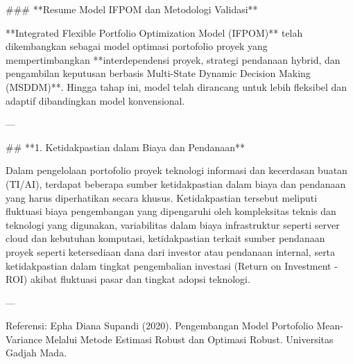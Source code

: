### **Resume Model IFPOM dan Metodologi Validasi**

**Integrated Flexible Portfolio Optimization Model (IFPOM)** telah dikembangkan sebagai model optimasi portofolio proyek yang mempertimbangkan **interdependensi proyek, strategi pendanaan hybrid, dan pengambilan keputusan berbasis Multi-State Dynamic Decision Making (MSDDM)**. Hingga tahap ini, model telah dirancang untuk lebih fleksibel dan adaptif dibandingkan model konvensional.

---

## **1. Ketidakpastian dalam Biaya dan Pendanaan**

Dalam pengelolaan portofolio proyek teknologi informasi dan kecerdasan buatan (TI/AI), terdapat beberapa sumber ketidakpastian dalam biaya dan pendanaan yang harus diperhatikan secara khusus. Ketidakpastian tersebut meliputi fluktuasi biaya pengembangan yang dipengaruhi oleh kompleksitas teknis dan teknologi yang digunakan, variabilitas dalam biaya infrastruktur seperti server cloud dan kebutuhan komputasi, ketidakpastian terkait sumber pendanaan proyek seperti ketersediaan dana dari investor atau pendanaan internal, serta ketidakpastian dalam tingkat pengembalian investasi (Return on Investment - ROI) akibat fluktuasi pasar dan tingkat adopsi teknologi.

---

Referensi: Epha Diana Supandi (2020). Pengembangan Model Portofolio Mean-Variance Melalui Metode Estimasi Robust dan Optimasi Robust. Universitas Gadjah Mada.
